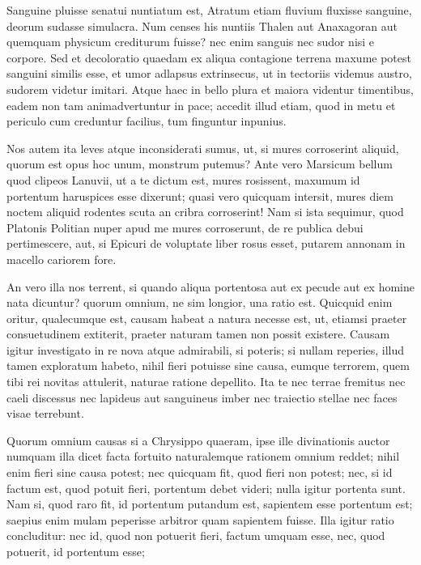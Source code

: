  Sanguine pluisse senatui nuntiatum est, Atratum etiam fluvium fluxisse sanguine, deorum sudasse simulacra. Num censes his nuntiis Thalen aut Anaxagoran aut quemquam physicum crediturum fuisse? nec enim sanguis nec sudor nisi e corpore. Sed et decoloratio quaedam ex aliqua contagione terrena maxume potest sanguini similis esse, et umor adlapsus extrinsecus, ut in tectoriis videmus austro, sudorem videtur imitari. Atque haec in bello plura et maiora videntur timentibus, eadem non tam animadvertuntur in pace; accedit illud etiam, quod in metu et periculo cum creduntur facilius, tum finguntur inpunius.

 Nos autem ita leves atque inconsiderati sumus, ut, si mures corroserint aliquid, quorum est opus hoc unum, monstrum putemus? Ante vero Marsicum bellum quod clipeos Lanuvii, ut a te dictum est, mures rosissent, maxumum id portentum haruspices esse dixerunt; quasi vero quicquam intersit, mures diem noctem aliquid rodentes scuta an cribra corroserint! Nam si ista sequimur, quod Platonis Politian nuper apud me mures corroserunt, de re publica debui pertimescere, aut, si Epicuri de voluptate liber rosus esset, putarem annonam in macello cariorem fore.

 An vero illa nos terrent, si quando aliqua portentosa aut ex pecude aut ex homine nata dicuntur? quorum omnium, ne sim longior, una ratio est. Quicquid enim oritur, qualecumque est, causam habeat a natura necesse est, ut, etiamsi praeter consuetudinem extiterit, praeter naturam tamen non possit existere. Causam igitur investigato in re nova atque admirabili, si poteris; si nullam reperies, illud tamen exploratum habeto, nihil fieri potuisse sine causa, eumque terrorem, quem tibi rei novitas attulerit, naturae ratione depellito. Ita te nec terrae fremitus nec caeli discessus nec lapideus aut sanguineus imber nec traiectio stellae nec faces visae terrebunt.

 Quorum omnium causas si a Chrysippo quaeram, ipse ille divinationis auctor numquam illa dicet facta fortuito naturalemque rationem omnium reddet; nihil enim fieri sine causa potest; nec quicquam fit, quod fieri non potest; nec, si id factum est, quod potuit fieri, portentum debet videri; nulla igitur portenta sunt. Nam si, quod raro fit, id portentum putandum est, sapientem esse portentum est; saepius enim mulam peperisse arbitror quam sapientem fuisse. Illa igitur ratio concluditur: nec id, quod non potuerit fieri, factum umquam esse, nec, quod potuerit, id portentum esse;

